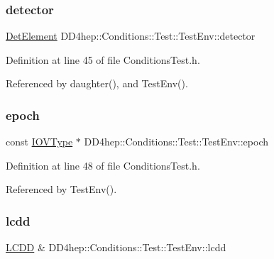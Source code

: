 \subsubsection{\texorpdfstring{detector}{detector}}
{\footnotesize\ttfamily \hyperlink{class_d_d4hep_1_1_geometry_1_1_det_element}{Det\+Element} D\+D4hep\+::\+Conditions\+::\+Test\+::\+Test\+Env\+::detector}



Definition at line 45 of file Conditions\+Test.\+h.



Referenced by daughter(), and Test\+Env().

\hypertarget{struct_d_d4hep_1_1_conditions_1_1_test_1_1_test_env_a71fce3b33ebcdf5f35f433f88e6ab9d6}{}\label{struct_d_d4hep_1_1_conditions_1_1_test_1_1_test_env_a71fce3b33ebcdf5f35f433f88e6ab9d6} 
\subsubsection{\texorpdfstring{epoch}{epoch}}
{\footnotesize\ttfamily const \hyperlink{class_d_d4hep_1_1_i_o_v_type}{I\+O\+V\+Type} $\ast$ D\+D4hep\+::\+Conditions\+::\+Test\+::\+Test\+Env\+::epoch}



Definition at line 48 of file Conditions\+Test.\+h.



Referenced by Test\+Env().

\hypertarget{struct_d_d4hep_1_1_conditions_1_1_test_1_1_test_env_a6939ff406dbff1ad30aa6ce492dc3ebf}{}\label{struct_d_d4hep_1_1_conditions_1_1_test_1_1_test_env_a6939ff406dbff1ad30aa6ce492dc3ebf} 
\subsubsection{\texorpdfstring{lcdd}{lcdd}}
{\footnotesize\ttfamily \hyperlink{class_d_d4hep_1_1_geometry_1_1_l_c_d_d}{L\+C\+DD} \& D\+D4hep\+::\+Conditions\+::\+Test\+::\+Test\+Env\+::lcdd}



